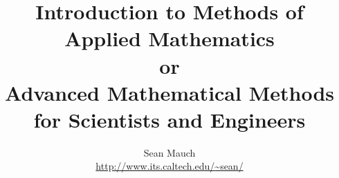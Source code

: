 \documentclass[oneside]{book}
\title{Introduction to Methods of Applied Mathematics\\
        or\\
        Advanced Mathematical Methods for Scientists and Engineers}
\author{Sean Mauch\\
  \href{http://www.its.caltech.edu/~sean/}
       {http://www.its.caltech.edu/{\~{}}sean/}
}
\begin{document}
\sffamily


\end{document}
